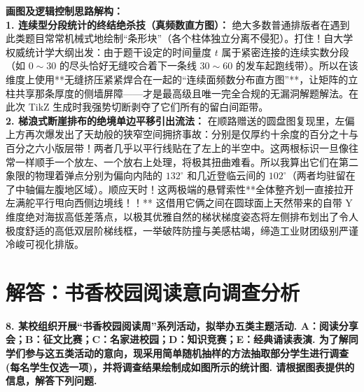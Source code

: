 {\small\color{blue!70!black}
\textbf{画图及逻辑控制思路解构：}\\
\textbf{1. 连续型分段统计的终结绝杀技（真频数直方图）：} 绝大多数普通排版者在遇到此类题目常常机械式地绘制“条形块”（各个柱体独立分离不侵犯）。打住！自大学权威统计学大纲出发：由于题干设定的时间量度 $t$ 属于紧密连接的连续实数分段（如 $0{\sim}30$ 的尽头恰好无缝咬合着下一条线 $30{\sim}60$ 的发车起跑线带）。所以在该维度上使用**无缝挤压紧紧焊合在一起的“连续面频数分布直方图”**，让矩阵的立柱共享那条厚度的侧墙屏障——才是最高级且唯一完全合规的无漏洞解题解法。在此次 TikZ 生成时我强势切断剥夺了它们所有的留白间距带。\\
\textbf{2. 梯浪式断崖排布的绝境单边平移引出流法：} 在顺路赠送的圆盘图复现里，左偏上方再次爆发出了天劫般的狭窄空间拥挤事故：分别是仅厚约十余度的百分之十与百分之六小版层带！两者几乎以平行线贴在了左上的半空中。这两根标识一旦像往常一样顺手一个放左、一个放右上处理，将极其扭曲难看。所以我算出它们在第二象限的物理着弹点分别为偏向内陆的 $132^\circ$ 和几近登临云间的 $102^\circ$（两者均驻留在了中轴偏左腹地区域）。顺应天时！这两极端的悬臂索性**全体整齐划一直接拉开左满舵平行甩向西侧边境线！！** 这借用它俩之间在圆球面上天然带来的自带 Y 维度绝对海拔高低差落点，以极其优雅自然的梯状梯度姿态将左侧排布划出了令人极度舒适的高低双层阶梯线框，一举破阵防撞与美感枯竭，缔造工业财团级别严谨冷峻可视化排版。
}



\newpage





\newpage

\section{解答：书香校园阅读意向调查分析}

\vspace{0.6cm}

\textbf{8. 某校组织开展“书香校园阅读周”系列活动，拟举办五类主题活动. A：阅读分享会；B：征文比赛；C：名家进校园；D：知识竞赛；E：经典诵读表演. 为了解同学们参与这五类活动的意向，现采用简单随机抽样的方法抽取部分学生进行调查(每名学生仅选一项)，并将调查结果绘制成如图所示的统计图. 请根据图表提供的信息，解答下列问题.}

\vspace{0.4cm}

